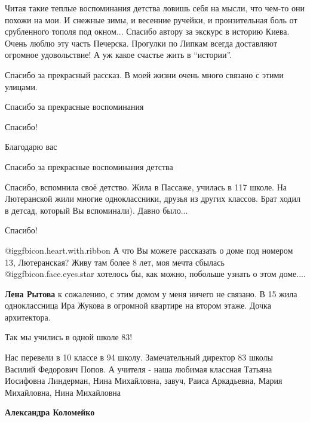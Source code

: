 \begin{itemize}

Читая такие теплые воспоминания детства ловишь себя на мысли, что чем-то они
похожи на мои. И снежные зимы, и весенние ручейки, и пронзительная боль от
срубленного тополя под окном... Спасибо автору за экскурс в историю Киева. Очень
люблю эту часть Печерска. Прогулки по Липкам всегда доставляют огромное
удовольствие! А уж какое счастье жить в \enquote{истории}.


Спасибо за прекрасный рассказ. В моей жизни очень много связано с этими улицами.

Спасибо за прекрасные воспоминания

Спасибо!

Благодарю вас

Спасибо за прекрасные воспоминания детства


Спасибо, вспомнила своё детство. Жила в Пассаже, училась в 117 школе. На
Лютеранской жили многие одноклассники, друзья из других классов. Брат ходил в
детсад, который Вы вспоминали). Давно было...


Спасибо!


 @igg{fbicon.heart.with.ribbon} А что Вы можете рассказать о доме под номером 13, Лютеранская? Живу там более
8 лет, моя мечта сбылась @igg{fbicon.face.eyes.star} хотелось бы, как можно, побольше узнать о этом
доме....

\begin{itemize} %
\textbf{Лена Рытова} к сожалению, с этим домом у меня ничего не связано. В 15 жила одноклассница Ира Жукова в огромной квартире на втором этаже. Дочка архитектора.
\end{itemize} %

Так мы учились в одной школе 83!


Нас перевели в 10 классе в 94 школу. Замечательный директор 83 школы Василий
Федорович Попов. А учителя - наша любимая классная Татьяна Иосифовна Линдерман,
Нина Михайловна, завуч, Раиса Аркадьевна, Мария Михайловна, Нина Михайловна

\begin{itemize} %
\textbf{Александра Коломейко} 


\end{itemize}
\end{itemize}
